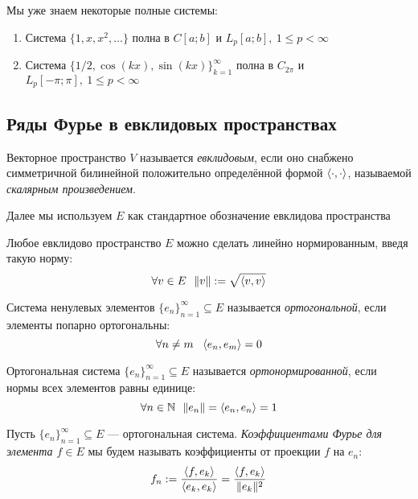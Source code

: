 \begin{corollary}
	Мы уже знаем некоторые полные системы:
	\begin{enumerate}
		\item Система $\{1, x, x^2, \ldots\}$ полна в $C[a; b]$ и $L_p[a; b],\ 1 \le p < \infty$
		
		\item Система $\{1 / 2, \cos(kx), \sin(kx)\}_{k = 1}^\infty$ полна в $C_{2\pi}$ и $L_p[-\pi; \pi],\ 1 \le p < \infty$
	\end{enumerate}
\end{corollary}

\subsection{Ряды Фурье в евклидовых пространствах}

\begin{reminder}
	Векторное пространство $V$ называется \textit{евклидовым}, если оно снабжено симметричной билинейной положительно определённой формой $\left\langle\cdot, \cdot\right\rangle$, называемой \textit{скалярным произведением}.
\end{reminder}

\begin{note}
	Далее мы используем $E$ как стандартное обозначение евклидова пространства
\end{note}

\begin{reminder}
	Любое евклидово пространство $E$ можно сделать линейно нормированным, введя такую норму:
	\[
		\forall v \in E\ \ \|v\| := \sqrt{\left\langle v, v\right\rangle}
	\]
\end{reminder}

\begin{definition}
	Система ненулевых элементов $\{e_n\}_{n = 1}^\infty \subseteq E$ называется \textit{ортогональной}, если элементы попарно ортогональны:
	\[
		\forall n \neq m\ \ \left\langle e_n, e_m\right\rangle = 0
	\]
\end{definition}

\begin{definition}
	Ортогональная система $\{e_n\}_{n = 1}^\infty \subseteq E$ называется \textit{ортонормированной}, если нормы всех элементов равны единице:
	\[
		\forall n \in \mathbb{N}\ \ \|e_n\| = \left\langle e_n, e_n\right\rangle = 1
	\]
\end{definition}

\begin{definition}
	Пусть $\{e_n\}_{n = 1}^\infty \subseteq E$ --- ортогональная система. \textit{Коэффициентами Фурье для элемента $f \in E$} мы будем называть коэффициенты от проекции $f$ на $e_n$:
	\[
		f_n := \frac{\left\langle f, e_k\right\rangle}{\left\langle e_k, e_k\right\rangle} = \frac{\left\langle f, e_k\right\rangle}{\|e_k\|^2}
	\]
\end{definition}

